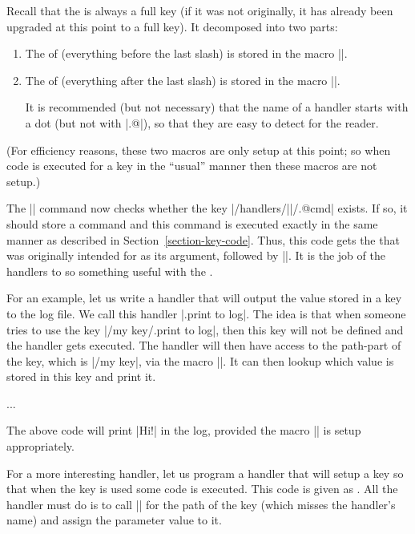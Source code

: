 Recall that the  is always a full key (if it was not
originally, it has already been upgraded at this point to a full
key). It decomposed into  two parts:

\begin{enumerate}
\item The  of  (everything
  before the last slash) is stored in the macro |\pgfkeyscurrentpath|.
\item The  of  (everything
  after the last slash) is stored in the macro |\pgfkeyscurrentname|.

  It is recommended (but not necessary) that the name of a handler
  starts with a dot (but not with |.@|), so that they are easy to
  detect for the reader.  
\end{enumerate}

(For efficiency reasons, these two macros are only setup at this point;
so when code is executed for a key in the ``usual'' manner then these
macros are not setup.)

The |\pgfkeys| command now checks whether the key
|/handlers/||/.@cmd| exists. If so, it should store a command
and this command is executed exactly in the same manner as described
in Section~\ref{section-key-code}.
Thus, this code gets the  that was originally intended for
 as its argument, followed by |\pgfeov|.
It is the job of the handlers to so something useful with the
.

For an example, let us write a handler that will output the value
stored in a key to the log file. We call this handler
|.print to log|. The idea is that when someone tries to use the key
|/my key/.print to log|, then this key will not be defined and the
handler gets executed. The handler will then have access to the
path-part of the key, which is |/my key|, via the macro
|\pgfkeyscurrentpath|. It can then lookup which value is stored in
this key and print it.

\begin{codeexample}
{%
  \pgfkeysgetvalue{\pgfkeyscurrentpath}{\temp}
  \writetolog{\temp}
}
...
\end{codeexample}
The above code will print |Hi!| in the log, provided the macro
|\writetolog| is setup appropriately.

For a more interesting handler, let us program a handler that will
setup a key so that when the key is used some code is executed. This
code is given as . All the handler must do is to call
|\pgfkeysdef| for the path of the key (which misses the handler's
name) and assign the parameter value to it.
\begin{codeexample}[]
\end{codeexample}



